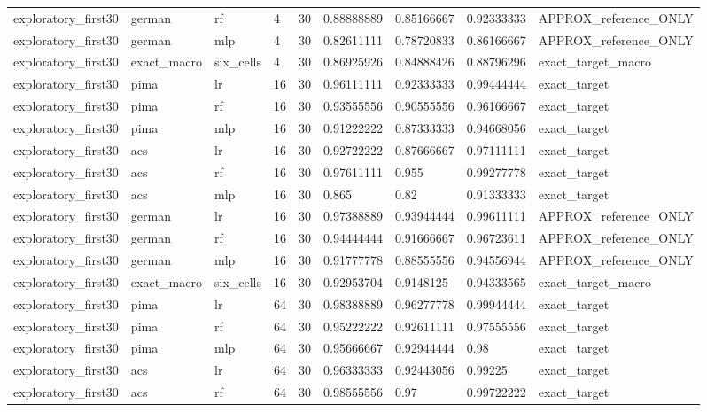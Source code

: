 \begin{tabular}{lllllllll}
exploratory\_first30 & german & rf & 4 & 30 & 0.88888889 & 0.85166667 & 0.92333333 & APPROX\_reference\_ONLY \\
exploratory\_first30 & german & mlp & 4 & 30 & 0.82611111 & 0.78720833 & 0.86166667 & APPROX\_reference\_ONLY \\
exploratory\_first30 & exact\_macro & six\_cells & 4 & 30 & 0.86925926 & 0.84888426 & 0.88796296 & exact\_target\_macro \\
exploratory\_first30 & pima & lr & 16 & 30 & 0.96111111 & 0.92333333 & 0.99444444 & exact\_target \\
exploratory\_first30 & pima & rf & 16 & 30 & 0.93555556 & 0.90555556 & 0.96166667 & exact\_target \\
exploratory\_first30 & pima & mlp & 16 & 30 & 0.91222222 & 0.87333333 & 0.94668056 & exact\_target \\
exploratory\_first30 & acs & lr & 16 & 30 & 0.92722222 & 0.87666667 & 0.97111111 & exact\_target \\
exploratory\_first30 & acs & rf & 16 & 30 & 0.97611111 & 0.955 & 0.99277778 & exact\_target \\
exploratory\_first30 & acs & mlp & 16 & 30 & 0.865 & 0.82 & 0.91333333 & exact\_target \\
exploratory\_first30 & german & lr & 16 & 30 & 0.97388889 & 0.93944444 & 0.99611111 & APPROX\_reference\_ONLY \\
exploratory\_first30 & german & rf & 16 & 30 & 0.94444444 & 0.91666667 & 0.96723611 & APPROX\_reference\_ONLY \\
exploratory\_first30 & german & mlp & 16 & 30 & 0.91777778 & 0.88555556 & 0.94556944 & APPROX\_reference\_ONLY \\
exploratory\_first30 & exact\_macro & six\_cells & 16 & 30 & 0.92953704 & 0.9148125 & 0.94333565 & exact\_target\_macro \\
exploratory\_first30 & pima & lr & 64 & 30 & 0.98388889 & 0.96277778 & 0.99944444 & exact\_target \\
exploratory\_first30 & pima & rf & 64 & 30 & 0.95222222 & 0.92611111 & 0.97555556 & exact\_target \\
exploratory\_first30 & pima & mlp & 64 & 30 & 0.95666667 & 0.92944444 & 0.98 & exact\_target \\
exploratory\_first30 & acs & lr & 64 & 30 & 0.96333333 & 0.92443056 & 0.99225 & exact\_target \\
exploratory\_first30 & acs & rf & 64 & 30 & 0.98555556 & 0.97 & 0.99722222 & exact\_target \\

\end{tabular}
